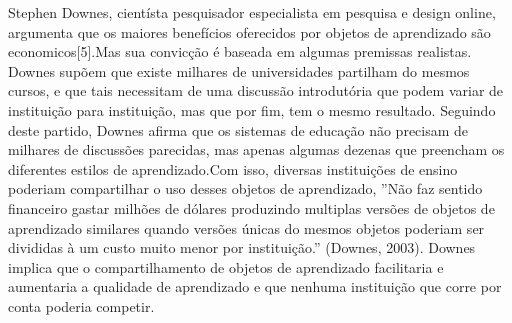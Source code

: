 \documentclass[12pt,openright,oneside,a4paper,english,french,spanish,brazil]{unifil}
\begin{document}

Stephen Downes, cientísta pesquisador especialista em pesquisa e design online, argumenta que os maiores benefícios oferecidos por objetos de aprendizado são economicos[5].Mas sua convicção é baseada em algumas premissas realistas.
Downes supõem que existe milhares de universidades partilham do mesmos cursos, e que tais necessitam de uma discussão introdutória que podem variar de instituição para instituição, mas que por fim, tem o mesmo resultado. Seguindo deste partido, Downes afirma que os sistemas de educação não precisam de milhares de discussões parecidas, mas apenas algumas dezenas que preencham os diferentes estilos de aprendizado.Com isso, diversas instituições de ensino poderiam compartilhar o uso desses objetos de aprendizado, ''Não faz sentido financeiro gastar milhões de dólares produzindo multiplas versões de objetos de aprendizado similares quando versões únicas do mesmos objetos poderiam ser divididas à um custo muito menor por instituição.'' (Downes, 2003). Downes implica que o compartilhamento de objetos de aprendizado facilitaria e aumentaria a qualidade de aprendizado e que nenhuma instituição que corre por conta poderia competir.
\end{document}
